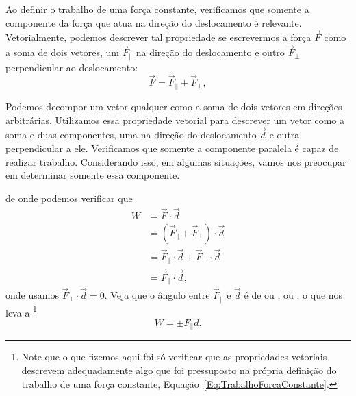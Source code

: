 Ao definir o trabalho de uma força constante, verificamos que somente a componente da força que atua na direção do deslocamento é relevante. Vetorialmente, podemos descrever tal propriedade se escrevermos a força $\vec{F}$ como a soma de dois vetores, um $\vec{F}_{\parallel}$ na direção do deslocamento e outro $\vec{F}_{\perp}$ perpendicular ao deslocamento:
\begin{equation}
    \vec{F} = \vec{F}_{\parallel} + \vec{F}_{\perp},
\end{equation}
%
\begin{marginfigure}[-3cm]
\centering
{}
\caption{Podemos decompor um vetor qualquer como a soma de dois vetores em direções arbitrárias. Utilizamos essa propriedade vetorial para descrever um vetor como a soma e duas componentes, uma na direção do deslocamento $\vec{d}$ e outra perpendicular a ele. Verificamos que somente a componente paralela é capaz de realizar trabalho. Considerando isso, em algumas situações, vamos nos preocupar em determinar somente essa componente.}
\end{marginfigure}
%
\noindent{}de onde podemos verificar que
\begin{align}
    W &= \vec{F}\cdot\vec{d} \\
    &= (\vec{F}_{\parallel} + \vec{F}_{\perp})\cdot\vec{d} \\
    &= \vec{F}_{\parallel} \cdot \vec{d} + \vec{F}_{\perp} \cdot \vec{d} \\
    &= \vec{F}_{\parallel} \cdot \vec{d},
\end{align}
%
onde usamos $\vec{F}_{\perp} \cdot \vec{d} = 0$. Veja que o ângulo entre $\vec{F}_{\parallel}$ e $\vec{d}$ é de ou , ou , o que nos leva a \footnote{Note que o que fizemos aqui foi só verificar que as propriedades vetoriais descrevem adequadamente algo que foi pressuposto na própria definição do trabalho de uma força constante, Equação~\ref{Eq:TrabalhoForcaConstante}.}
\begin{equation}\label{eq:TrabalhoDecompForca}
    W = \pm F_{\parallel} d.
\end{equation}

